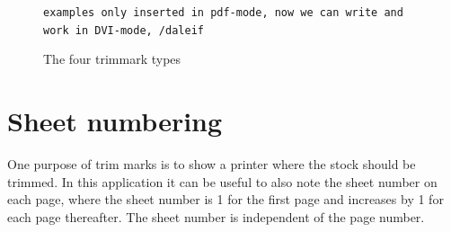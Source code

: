 \begin{figure}[htbp]
  \else%
  \texttt{examples only inserted in pdf-mode, now we can write and
    work in DVI-mode, /daleif}
  \fi%
  \caption{The four trimmark types}
  \label{fig:trimmarks}
\end{figure}





\section{Sheet numbering}

    One purpose of trim marks is to show a printer where the stock
should be trimmed. In this application it can be useful to also note the
sheet number on each page, where the sheet number is 1 for the first page 
and increases by 1 for each page thereafter. The sheet number is independent
of the page number.

